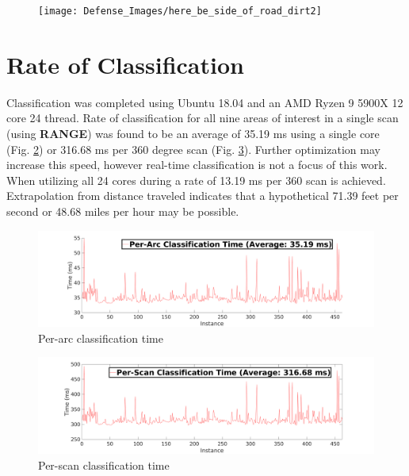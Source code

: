 \documentclass[numbered,pdftex]{ohio-etd}
\begin{document}
{{		\begin{figure}[H]
			\centering
			\texttt{[image: Defense\_Images/here\_be\_side\_of\_road\_dirt2]}
			\caption[Blackburn Road Side of Road]{}
			\label{fig:here_be_side_of_road_dirt2}
		\end{figure}
		
	}



	\section{Rate of Classification}{
		
		{Classification was completed using Ubuntu 18.04 and an AMD Ryzen 9 5900X 12 core 24 thread. Rate of classification for all nine areas of interest in a single scan (using \textbf{RANGE}) was found to be an average of 35.19 ms using a single core (Fig. \ref{fig:per_arc_classification_time}) or 316.68 ms per 360 degree scan (Fig. \ref{fig:per_scan_classification_rate}). Further optimization may increase this speed, however real-time classification is not a focus of this work. When utilizing all 24 cores during a rate of 13.19 ms per 360 scan is achieved. Extrapolation from distance traveled indicates that a hypothetical 71.39 feet per second or 48.68 miles per hour may be possible.}
		
		\begin{figure}[H]
			\centering
			\includegraphics[width=0.9\linewidth]{Defense_Images/per_arc_classification_time}
			\caption[Per-Arc Time]{Per-arc classification time}
			\label{fig:per_arc_classification_time}
		\end{figure}
		
		\begin{figure}[H]
			\centering
			\includegraphics[width=0.9\linewidth]{Defense_Images/per_scan_classification_rate}
			\caption[Per-Scan Time]{Per-scan classification time}
			\label{fig:per_scan_classification_rate}
		\end{figure}
		
	}
		
} %
\end{document}
